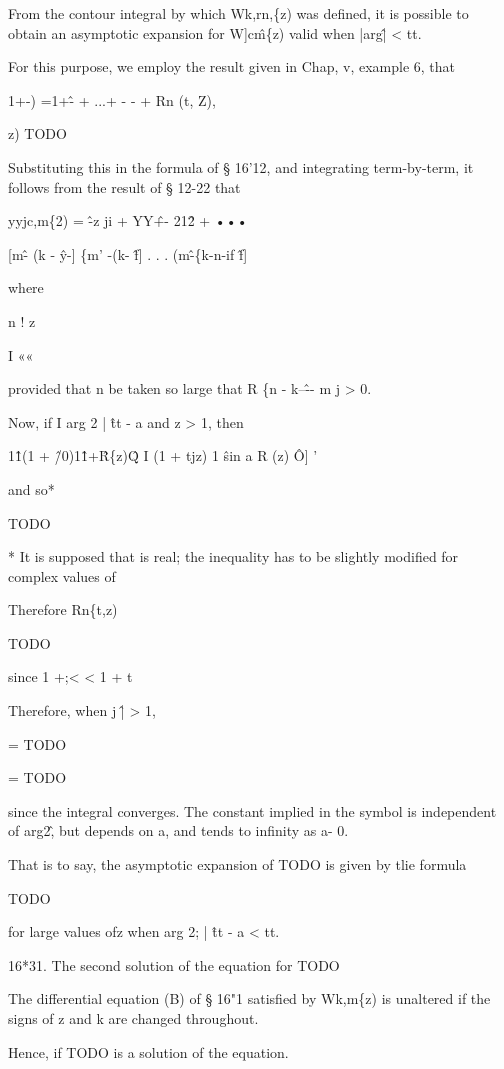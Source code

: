 From the contour integral by which Wk,rn,\{z) was defined, it is
possible to obtain an asymptotic expansion for W]c\^m\{z) valid when
|arg\^| < tt.

For this purpose, we employ the result given in Chap, v, example 6,
that

1+-) =1+\^- + ...+ - - + Rn (t, Z),

z) TODO

Substituting this in the formula of § 16'12, and integrating
term-by-term, it follows from the result of § 12-22 that

yyjc,m\{2) = \^ -z ji + YY\^ +- 21\^2 + •••

[m\^ - (k - \^y-] \{m' -(k- \^f] . . . (m\^ -\{k-n-if \^f]

where

n ! z

I ««

provided that n be taken so large that R \{n - k--\^-- m j > 0.

Now, if I arg 2 | \^ tt - a and z > 1, then

1\^1(1 + \^/0)1\^1+\^ R\{z)\^Q I (1 + tjz) 1 \^ sin a R (z) \^ O] '

and so*

TODO

* It is supposed that is real; the inequality has to be slightly
modified for complex values of

%
%

Therefore Rn\{t,z)

TODO

since 1 +;< < 1 + t

Therefore, when j \^ | > 1,

= TODO

= TODO

since the integral converges. The constant implied in the symbol is
independent of arg2\^, but depends on a, and tends to infinity as a-
0.

That is to say, the asymptotic expansion of TODO is given by tlie
formula

TODO

for large values ofz when arg 2; | \^ tt - a < tt.

16*31. The second solution of the equation for TODO

The differential equation (B) of § 16"1 satisfied by Wk,m\{z) is
unaltered if the signs of z and k are changed throughout.

Hence, if TODO is a solution of the equation.


